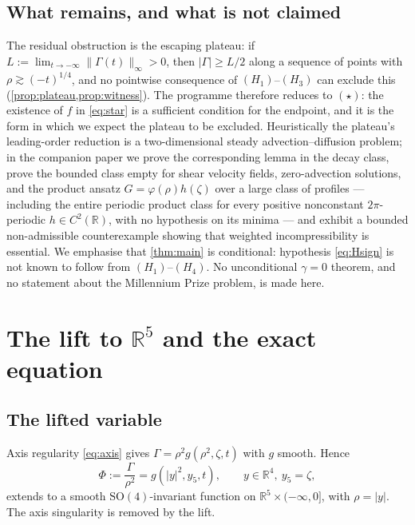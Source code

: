 \documentclass[11pt]{article}
\theoremstyle{definition}
\newcommand{\R}{\mathbb{R}}
\begin{document}
\subsection{What remains, and what is not claimed}
The residual obstruction is the escaping plateau: if
$L:=\lim_{t\to-\infty}\|\Gamma(t)\|_\infty>0$, then $|\Gamma|\ge L/2$ along a
sequence of points with $\rho\gtrsim(-t)^{1/4}$, and no pointwise consequence
of $(H_1)$--$(H_3)$ can exclude this
(\cref{prop:plateau,prop:witness}). The programme therefore reduces to
$(\star)$: the existence of $f$ in \eqref{eq:star} is a sufficient condition
for the endpoint, and it is the form in which we expect the plateau to be
excluded. Heuristically the plateau's leading-order reduction is a
two-dimensional steady advection--diffusion problem; in the companion paper
\cite{companion} we prove the corresponding lemma in the decay class, prove
the bounded class empty for shear velocity fields, zero-advection solutions,
and the product ansatz $G=\varphi(\rho)h(\zeta)$ over a large class of
profiles --- including the entire periodic product class for every positive
nonconstant $2\pi$-periodic $h\in C^2(\R)$, with no hypothesis on its minima
--- and exhibit a bounded non-admissible counterexample showing that weighted
incompressibility is essential. We emphasise
that
\cref{thm:main} is conditional: hypothesis \eqref{eq:Hsign} is not known to
follow from $(H_1)$--$(H_4)$. No unconditional $\gamma=0$ theorem, and no
statement about the Millennium Prize problem, is made here.

\section{The lift to $\R^5$ and the exact equation}

\subsection{The lifted variable}
Axis regularity \eqref{eq:axis} gives $\Gamma=\rho^2g(\rho^2,\zeta,t)$
with $g$ smooth. Hence
\begin{equation}\label{eq:Phi}
\Phi:=\frac{\Gamma}{\rho^2}=g(|y|^2,y_5,t),\qquad y\in\R^4,\ y_5=\zeta,
\end{equation}
extends to a smooth $\mathrm{SO}(4)$-invariant function on
$\R^5\times(-\infty,0]$, with $\rho=|y|$. The axis singularity is removed by
the lift.
\end{document}
